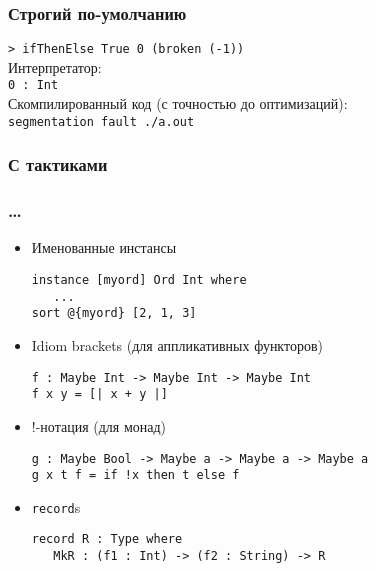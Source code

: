 \begin{frame}[fragile]
   \frametitle{Строгий по-умолчанию}
   
   \texttt{> ifThenElse True 0 (broken (-1))}\\\vspace{0.5em}
   Интерпретатор:\\
   \texttt{0 : Int}\\\vspace{0.5em}
   Скомпилированный код (с точностью до оптимизаций):\\
   \texttt{segmentation fault ./a.out}
\end{frame}

\begin{frame}[fragile]
   \frametitle{С тактиками}
   
\end{frame}

\begin{frame}[fragile]
   \frametitle{\dots}
   \begin{itemize}
   \item Именованные инстансы
         \begin{lstlisting}
instance [myord] Ord Int where
   ...
sort @{myord} [2, 1, 3]
         \end{lstlisting}
   \item Idiom brackets (для аппликативных функторов)
         \begin{lstlisting}
f : Maybe Int -> Maybe Int -> Maybe Int
f x y = [| x + y |]
         \end{lstlisting}
   \item !-нотация (для монад)
         \begin{lstlisting}
g : Maybe Bool -> Maybe a -> Maybe a -> Maybe a
g x t f = if !x then t else f
         \end{lstlisting}
   \item \texttt{\color{kwcolor}record}s
      \begin{lstlisting}
record R : Type where
   MkR : (f1 : Int) -> (f2 : String) -> R
      \end{lstlisting}
   \end{itemize}
\end{frame}

